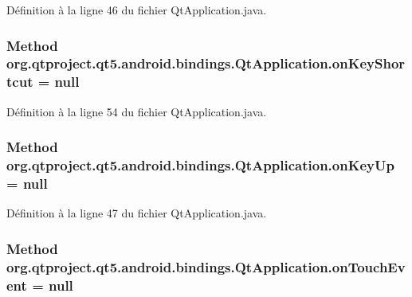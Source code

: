 Définition à la ligne 46 du fichier Qt\-Application.\-java.

\hypertarget{classorg_1_1qtproject_1_1qt5_1_1android_1_1bindings_1_1_qt_application_a1ce0a33219f8c6103b216ed433ceeefe}{
\subsubsection[{on\-Key\-Shortcut}]{\setlength{\rightskip}{0pt plus 5cm}Method org.\-qtproject.\-qt5.\-android.\-bindings.\-Qt\-Application.\-on\-Key\-Shortcut = null\hspace{0.3cm}{\ttfamily [static]}}}\label{classorg_1_1qtproject_1_1qt5_1_1android_1_1bindings_1_1_qt_application_a1ce0a33219f8c6103b216ed433ceeefe}


Définition à la ligne 54 du fichier Qt\-Application.\-java.

\hypertarget{classorg_1_1qtproject_1_1qt5_1_1android_1_1bindings_1_1_qt_application_a947623196f7f382c1c2bf0737697082d}{
\subsubsection[{on\-Key\-Up}]{\setlength{\rightskip}{0pt plus 5cm}Method org.\-qtproject.\-qt5.\-android.\-bindings.\-Qt\-Application.\-on\-Key\-Up = null\hspace{0.3cm}{\ttfamily [static]}}}\label{classorg_1_1qtproject_1_1qt5_1_1android_1_1bindings_1_1_qt_application_a947623196f7f382c1c2bf0737697082d}


Définition à la ligne 47 du fichier Qt\-Application.\-java.

\hypertarget{classorg_1_1qtproject_1_1qt5_1_1android_1_1bindings_1_1_qt_application_ad8a6d1d7da859063ec8e5ba5b3db06c1}{
\subsubsection[{on\-Touch\-Event}]{\setlength{\rightskip}{0pt plus 5cm}Method org.\-qtproject.\-qt5.\-android.\-bindings.\-Qt\-Application.\-on\-Touch\-Event = null\hspace{0.3cm}{\ttfamily [static]}}}\label{classorg_1_1qtproject_1_1qt5_1_1android_1_1bindings_1_1_qt_application_ad8a6d1d7da859063ec8e5ba5b3db06c1}


